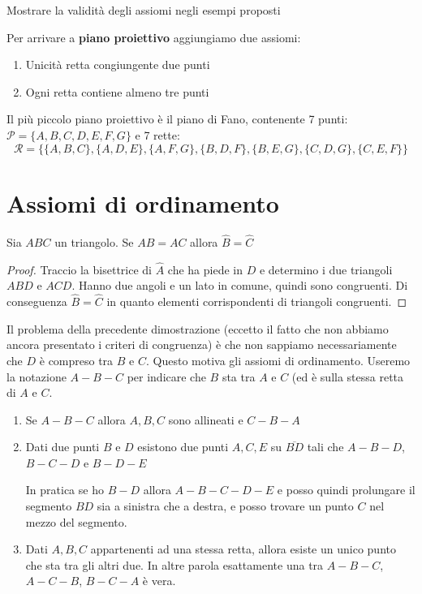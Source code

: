\begin{eser}
    Mostrare la validità degli assiomi negli esempi proposti
\end{eser}

Per arrivare a \textbf{piano proiettivo} aggiungiamo due assiomi:
\begin{enumerate}[label = \Roman*.]
    \item Unicità retta congiungente due punti
    \item Ogni retta contiene almeno tre punti
\end{enumerate}

Il più piccolo piano proiettivo è il piano di Fano, contenente 7 punti:
\(\mathcal{P} = \{A, B, C, D, E, F, G\} \)  
e 7 rette:
\[\mathcal{R} = \{\{A, B, C\}, \{A, D, E\}, \{A, F, G\}, \{B, D, F\}, \{B, E, G\},
\{C, D, G\}, \{C, E, F\} \} \]

\section{Assiomi di ordinamento}
\begin{proposition}
    Sia \(ABC\) un triangolo. Se \(AB = AC\) allora \(\hat{B} = \hat{C}\) 
\end{proposition}
\begin{proof}
    Traccio la bisettrice di \(\hat{A}\) che ha piede in \(D\) e determino i due
    triangoli  \(ABD\) e \(ACD\). Hanno due angoli e un lato in comune, quindi
    sono congruenti. Di conseguenza \(\hat{B} = \hat{C}\) in quanto elementi
    corrispondenti di triangoli congruenti.
\end{proof}

Il problema della precedente dimostrazione (eccetto il fatto che non abbiamo
ancora presentato i criteri di congruenza) è che non sappiamo necessariamente
che \(D\) è compreso tra \(B\) e \(C\). Questo motiva gli assiomi di
ordinamento. Useremo la notazione \(A - B - C\) per indicare che \(B\) sta tra
\(A\) e \(C\) (ed è sulla stessa retta di \(A\) e \(C\).

\begin{enumerate}[label = O\arabic*.]
    \item Se \(A - B - C\) allora \(A, B, C\) sono allineati e \(C - B - A\) 
    \item Dati due punti \(B\) e \(D\) esistono due punti \(A, C, E\) su
        \(\overline{BD}\) tali che \(A - B - D\), \(B - C - D\) e \(B - D - E\) 

        In pratica se ho \( B - D\) allora \( A - B - C - D - E\) e posso quindi
        prolungare il segmento \(BD\) sia a sinistra che a destra, e posso
        trovare un punto \(C\) nel mezzo del segmento.
    \item Dati \(A, B, C\) appartenenti ad una stessa retta, allora esiste un
        unico punto che sta tra gli altri due. In altre parola esattamente una
        tra \(A - B - C\), \(A - C - B\), \(B - C - A\) è vera.
\end{enumerate}

